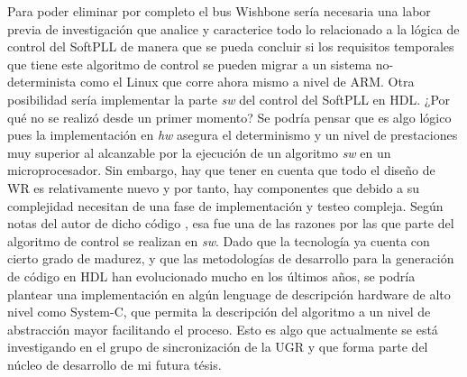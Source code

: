 Para poder eliminar por completo el bus Wishbone sería necesaria una labor 
previa de investigación que analice y caracterice todo lo relacionado a la 
lógica de control del SoftPLL de manera que se pueda concluir si los requisitos 
temporales que tiene este algoritmo de control se pueden migrar a un sistema 
no-determinista como el Linux que corre ahora mismo a nivel de ARM. Otra 
posibilidad sería implementar la parte \textit{sw} del control del SoftPLL en 
HDL. ¿Por qué no se realizó desde un primer momento? Se podría pensar que es 
algo lógico pues la implementación en \textit{hw} asegura el determinismo y un 
nivel de prestaciones muy superior al alcanzable por la ejecución de un 
algoritmo \textit{sw} en un microprocesador. Sin embargo, hay que tener en 
cuenta que todo el diseño de WR es relativamente nuevo y por tanto, hay 
componentes que debido a su complejidad necesitan de una fase de implementación 
y testeo compleja. Según notas del autor de dicho código , esa fue una de las razones por las que parte del algoritmo de 
control se realizan en \textit{sw}. Dado que la tecnología ya cuenta con cierto 
grado de madurez, y que las metodologías de desarrollo para la generación de 
código en HDL han evolucionado mucho en los últimos años, se podría plantear 
una implementación en algún lenguage de descripción hardware de alto nivel como 
System-C, que permita la descripción del algoritmo a un nivel de abstracción 
mayor facilitando el proceso. Esto es algo que actualmente se está investigando 
en el grupo de sincronización de la UGR y que forma parte del núcleo de 
desarrollo de mi futura tésis.

